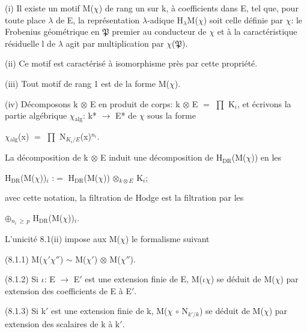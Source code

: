 \documentclass[10pt,twoside]{article}
\begin{document}
(i) Il existe un motif M(\ensuremath{χ}) de rang un sur k, à coefficients dans E, tel que, pour toute place \ensuremath{λ} de E, la représentation \ensuremath{λ}-adique H\ensuremath{_{λ}}M(\ensuremath{χ}) soit celle définie par \ensuremath{χ}: le Frobenius géométrique en \ensuremath{𝔓} premier au conducteur de \ensuremath{χ} et à la caractéristique résiduelle l de \ensuremath{λ} agit par multiplication par \ensuremath{χ}(\ensuremath{𝔓}).\par
(ii) Ce motif est caractérisé à isomorphisme près par cette propriété.\par
(iii) Tout motif de rang 1 est de la forme M(\ensuremath{χ}).\par
(iv) Décomposons k \ensuremath{⊗} E en produit de corps: k \ensuremath{⊗} E \ensuremath{=} \ensuremath{∏} K\ensuremath{_{i}}, et écrivons la partie algébrique \ensuremath{χ}\ensuremath{_{\mathrm{alg}}}: k* \ensuremath{→} E* de \ensuremath{χ} sous la forme\par
\ensuremath{χ}\ensuremath{_{\mathrm{alg}}}(x) \ensuremath{=} \ensuremath{∏} N\ensuremath{_{K_i/E}}(x)\ensuremath{^{n_i}}.\par
La décomposition de k \ensuremath{⊗} E induit une décomposition de H\ensuremath{_{\mathrm{DR}}}(M(\ensuremath{χ})) en les\par
H\ensuremath{_{\mathrm{DR}}}(M(\ensuremath{χ}))\ensuremath{_{i}} :\ensuremath{=} H\ensuremath{_{\mathrm{DR}}}(M(\ensuremath{χ})) \ensuremath{⊗}\ensuremath{_{k⊗E}} K\ensuremath{_{i}};\par
avec cette notation, la filtration de Hodge est la filtration par les\par
\ensuremath{⊕}\ensuremath{_{n_i\,≥\,p}} H\ensuremath{_{\mathrm{DR}}}(M(\ensuremath{χ}))\ensuremath{_{i}}.\par
L’unicité 8.1(ii) impose aux M(\ensuremath{χ}) le formalisme suivant\par
(8.1.1)    M(\ensuremath{χ}\ensuremath{′}\ensuremath{χ}\ensuremath{″}) \ensuremath{∼} M(\ensuremath{χ}\ensuremath{′}) \ensuremath{⊗} M(\ensuremath{χ}\ensuremath{″}).\par
(8.1.2) Si \ensuremath{ι}: E \ensuremath{→} E\ensuremath{′} est une extension finie de E, M(\ensuremath{ι}\ensuremath{χ}) se déduit de M(\ensuremath{χ}) par extension des coefficients de E à E\ensuremath{′}.\par
(8.1.3) Si k\ensuremath{′} est une extension finie de k, M(\ensuremath{χ} \ensuremath{∘} N\ensuremath{_{k′/k}}) se déduit de M(\ensuremath{χ}) par extension des scalaires de k à k\ensuremath{′}.\par
\end{document}
